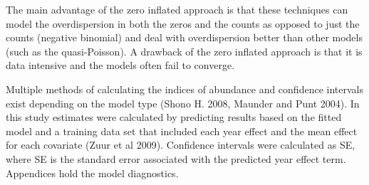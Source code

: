 \documentclass[12pt]{SCreport}
\begin{document}
The main advantage of the zero inflated approach is that these techniques can model the overdispersion in both the zeros and the counts as opposed to just the counts (negative binomial) and deal with overdispersion better than other models (such as the quasi-Poisson). A drawback of the zero inflated approach is that it is data intensive and the models often fail to converge.

Multiple methods of calculating the indices of abundance and confidence intervals exist depending on the model type (Shono H. 2008, Maunder and Punt 2004). In this study estimates were calculated by predicting results based on the fitted model and a training data set that included each year effect and  the mean effect for each covariate (Zuur et al 2009). Confidence intervals were calculated as %
SE, where SE is the standard error associated with the predicted year effect term.  Appendices hold the model diagnostics.
\end{document}
